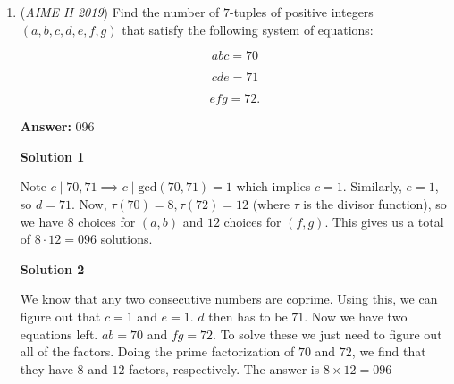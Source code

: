 \begin{enumerate}
 Thus, we have:

 $\frac{p}{q} = P_1 + P_2 + P_3 + P_4 \implies \frac{p}{q} = \frac{1}{8} + \frac{5}{32} + \frac{6}{16} + \frac{1}{64} \implies \frac{p}{q} = \frac{43}{64}$

 Therefore, $p + q = 43 + 64 \therefore \boxed{\mathbf{p + q = 107}}$.

 



\textbf{Solution 7  (Recursion)}

We can solve this problem by looking at the probabilities of landing on each individual lily pad. Lily pad number one has a probability of 1, lily pad number 2 has a probability of 1/2. We can see from quick casework on lily pad number 3(yielding 3/4) that the probability for any lily pad N is $\frac{N_{n-2}}{2}+\frac{N_{n-1}}{2}$. Quickly working this out, we see that the probability is $\frac{43}{64}$, so the answer is $\boxed{107}$..

 



\textbf{Solution in portuguese}





	\item (\textit{AIME II 2019}) Find the number of $7$-tuples of positive integers $(a,b,c,d,e,f,g)$ that satisfy the following system of equations: 

 \[abc=70\]

 \[cde=71\]

 \[efg=72.\]

 \textbf{Answer: }096



\textbf{Solution 1}

Note $c \mid 70, 71 \implies c \mid \text{gcd} (70, 71) = 1$ which implies $c=1$. Similarly, $e=1$, so $d=71$. Now, $\tau (70) = 8, \tau(72) = 12$ (where $\tau$ is the divisor function), so we have $8$ choices for $(a, b)$ and $12$ choices for $(f, g)$. This gives us a total of $8\cdot 12 = \boxed{096}$ solutions.

 



\textbf{Solution 2}

We know that any two consecutive numbers are coprime. Using this, we can figure out that $c=1$ and $e=1$. $d$ then has to be $71$. Now we have two equations left. $ab=70$ and $fg=72$. To solve these we just need to figure out all of the factors. Doing the prime factorization of $70$ and $72$, we find that they have $8$ and $12$ factors, respectively. The answer is $8 \times 12=\boxed{096}$





\end{enumerate}
